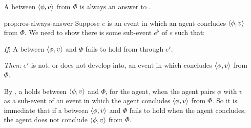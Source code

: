 \begin{note}
  \begin{proposition}%
    \label{prop:ros-always-answer}%
    A \ros{} between \(\langle \phi, v \rangle\) from \(\Phi\) is always an answer to \qWhyV{}.
  \end{proposition}

  \begin{argument}{prop:ros-always-answer}
    Suppose \(e\) is an event in which an agent concludes \(\langle \phi, v \rangle\) from \(\Phi\).
    We need to show there is some sub-event \(e^{\flat}\) of \(e\) such that:
    \begin{itenum}
    \item[\emph{If}:]
      A  between \(\langle \phi, v \rangle\) and \(\Phi\) fails to hold from  through \(e^{\flat}\).
    \item[\emph{Then}:]
      \(e^{\flat}\) is not, or does not develop into, an event in which \vAgent{} concludes \(\langle \phi, v \rangle\) from \(\Phi\).
    \end{itenum}
    By \supportI{}, a \ros{} holds between \(\langle \phi, v \rangle\) and \(\Phi\), for the agent, when the agent pairs \(\phi\) with \(v\) as a sub-event of an event in which the agent concludes \(\langle \phi, v \rangle\) from \(\Phi\).
    So it is immediate that if a \ros{} between \(\langle \phi, v \rangle\) and \(\Phi\) fails to hold when the agent concludes, the agent does not conclude \(\langle \phi, v \rangle\) from \(\Phi\).
  \end{argument}
\end{note}

